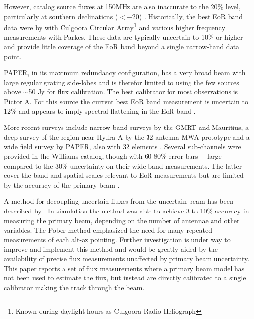 \documentclass[preprint]{aastex}
\begin{document}
However, catalog source fluxes at 150MHz are also inaccurate to the 20\% level,
particularly at southern declinations ($<-20$\arcdeg) . Historically, the best
EoR band data were by \citet{Slee:1995p7541} with Culgoora Circular
Array\footnote{Known during daylight hours as Culgoora Radio Heliograph} and
various higher frequency measurements with Parkes.  These data are typically
uncertain to 10\% or higher and provide little coverage of the EoR band beyond
a single narrow-band data point. 

PAPER, in its maximum redundancy configuration, has a very broad beam with
large regular grating side-lobes and is therefor limited to using the few
sources above $\sim$50 Jy for flux calibration. The best calibrator for most
observations is Pictor A. For this source the current best EoR band measurement
is uncertain to 12\% and appears to imply spectral flattening in the EoR band
\citep{Perley:1997p9312}.

More recent surveys include narrow-band surveys by the GMRT and Mauritius, a
deep survey of the region near Hydra A by the 32 antenna MWA prototype
\cite{Williams:2012p8768} and a wide field survey by PAPER, also with 32
elements \cite{Jacobs:2011p8438}. Several sub-channels were provided in the
Williams catalog, though with 60-80\% error bars ---large compared to the 30\%
uncertainty on their wide band measurements.  The latter cover the band and
spatial scales relevant to EoR measurements but are limited by the accuracy of
the primary beam \citep{Jacobs:2013p9713}.

A method for decoupling uncertain fluxes from the uncertain beam has been
described by \citet{Pober:2012p8800}. In simulation the method was able to
achieve 3 to 10\% accuracy in measuring the primary beam, depending on the
number of antennae and other variables. The Pober method emphasized the need
for many repeated measurements of each alt-az pointing. Further investigation
is under way to improve and implement this method and would be greatly aided by
the availability of precise flux measurements unaffected by primary beam
uncertainty. This paper reports a set of flux measurements where a primary beam
model has not been used to estimate the flux, but instead are directly
calibrated to a single calibrator making the track through the beam.
\end{document}
